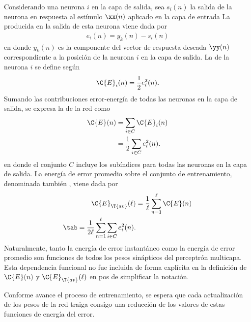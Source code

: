 Considerando una neurona $i$ en la capa de salida, sea $s_i(n)$ la
salida de la neurona en respuesta al estímulo $\xx(n)$ aplicado en la
capa de entrada
La
 producida en la salida de esta neurona viene dada
por
%
\begin{align}\label{e2:error-signal-neuron} %
  e_i(n)=y_{k}(n)-s_{i}(n)
\end{align}
%
en donde $y_k(n)$ es la componente del vector de respuesta deseada
$\yy(n)$ correspondiente a la posición de la neurona $i$ en la capa de
salida.
La  de la neurona $i$ se define según
%
\begin{align}\label{e2:error-energy-neuron} %
  \C{E}_i(n)=\frac{1}{2}e^2_i(n).
\end{align}
%
Sumando las contribuciones error-energía de todas las neuronas en la
capa de salida, se expresa la 
de la red como
%
\begin{align}\label{e2:error-energy-net} %
  \C{E}(n)&=\sum_{i\in C}\C{E}_i(n) \\
  &=\frac{1}{2}\sum_{i\in C}e^2_i(n).
\end{align}
%
en donde el conjunto $C$ incluye los subíndices para todas las
neuronas en la capa de salida. La energía de error promedio sobre el
conjunto de entrenamiento, denominada también ,
viene dada por
%
\begin{align}\label{e2:average-energy-net} %
  \C{E}_{\T{av}}(\ell)&=\frac{1}{\ell}\sum_{n=1}^\ell\C{E}(n) \\
  \tab=\frac{1}{2\ell} \sum_{n=1}^\ell \sum_{i\in C}e^2_i(n).
\end{align}
%
Naturalmente, tanto la energía de error instantáneo como la energía de
error promedio son funciones de todos los pesos sinápticos del
perceptrón multicapa. Esta dependencia funcional no fue incluida de
forma explícita en la definición de $\C{E}(n)$ y
$\C{E}_{\T{av}}(\ell)$ en pos de simplificar la notación.

Conforme avance el proceso de entrenamiento, se espera que cada
actualización de los pesos de la red traiga consigo una reducción de
los valores de estas funciones de energía del error.
